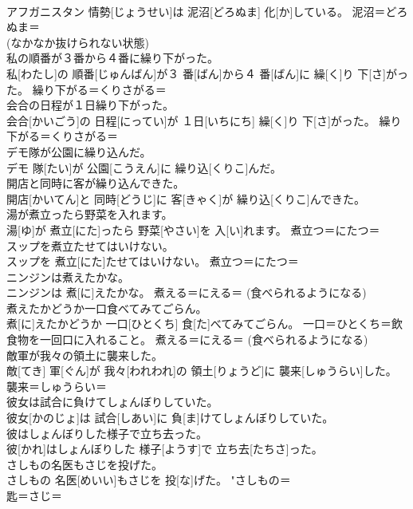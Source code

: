 \documentclass[8pt]{extreport}
\begin{document}
\begin{CJK}{UTF8}{min}
{\\	アフガニスタン 情勢[じょうせい]は 泥沼[どろぬま] 化[か]している。	泥沼＝どろぬま＝ 
\\	(なかなか抜けられない状態)
\\	私の順番が３番から４番に繰り下がった。	
\\	私[わたし]の 順番[じゅんばん]が３ 番[ばん]から４ 番[ばん]に 繰[く]り 下[さ]がった。	繰り下がる＝くりさがる＝ 
\\	会合の日程が１日繰り下がった。	
\\	会合[かいごう]の 日程[にってい]が １日[いちにち] 繰[く]り 下[さ]がった。	繰り下がる＝くりさがる＝ 
\\	デモ隊が公園に繰り込んだ。	
\\	デモ 隊[たい]が 公園[こうえん]に 繰り込[くりこ]んだ。	
\\	開店と同時に客が繰り込んできた。	
\\	開店[かいてん]と 同時[どうじ]に 客[きゃく]が 繰り込[くりこ]んできた。	
\\	湯が煮立ったら野菜を入れます。	
\\	湯[ゆ]が 煮立[にた]ったら 野菜[やさい]を 入[い]れます。	煮立つ＝にたつ＝ 
\\	スップを煮立たせてはいけない。	
\\	スップを 煮立[にた]たせてはいけない。	煮立つ＝にたつ＝ 
\\	ニンジンは煮えたかな。	
\\	ニンジンは 煮[に]えたかな。	煮える＝にえる＝ (食べられるようになる) 
\\	煮えたかどうか一口食べてみてごらん。	
\\	煮[に]えたかどうか 一口[ひとくち] 食[た]べてみてごらん。	一口＝ひとくち＝飲食物を一回口に入れること。 煮える＝にえる＝ (食べられるようになる) 
\\	敵軍が我々の領土に襲来した。	
\\	敵[てき] 軍[ぐん]が 我々[われわれ]の 領土[りょうど]に 襲来[しゅうらい]した。	襲来＝しゅうらい＝ 
\\	彼女は試合に負けてしょんぼりしていた。	
\\	彼女[かのじょ]は 試合[しあい]に 負[ま]けてしょんぼりしていた。	
\\	彼はしょんぼりした様子で立ち去った。	
\\	彼[かれ]はしょんぼりした 様子[ようす]で 立ち去[たちさ]った。	
\\	さしもの名医もさじを投げた。	
\\	さしもの 名医[めいい]もさじを 投[な]げた。	"さしもの＝ 
\\	匙＝さじ＝ 
}
\end{CJK}
\end{document}
